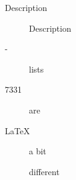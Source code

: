 \begin{description}
    \item[Description] Description 
    \item[-] lists
    \item[7331] are
    \item[\LaTeX] a bit
    \item[] different
\end{description}